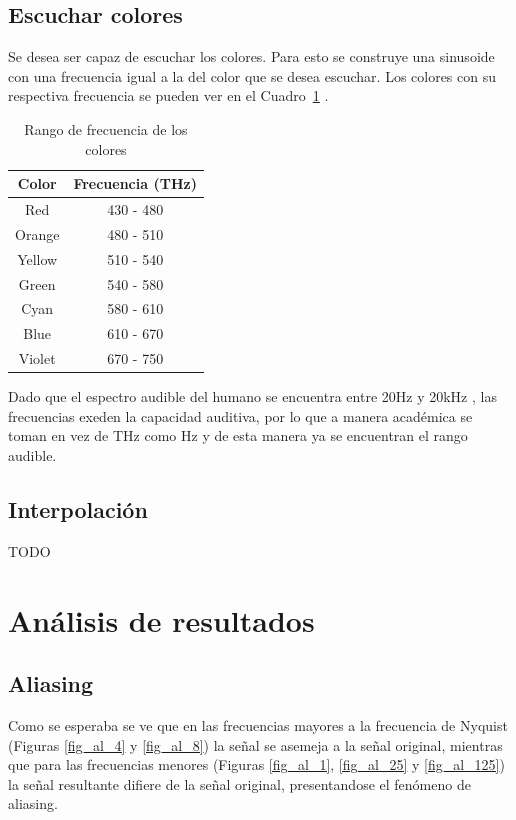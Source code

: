 \documentclass[comsoc, journal]{IEEEtran}
\begin{document}
\subsection{Escuchar colores}
Se desea ser capaz de escuchar los colores. Para esto se construye una sinusoide con una frecuencia igual a la del color que se desea escuchar. Los colores con su respectiva frecuencia se pueden ver en el Cuadro~\ref{table_color} \cite{bohren}.

\begin{table}[!t]
    \renewcommand{\arraystretch}{1.3}
    \caption{Rango de frecuencia de los colores}
    \label{table_color}
    \centering
    \begin{tabular}{|c|c|}
        \hline
        Color & Frecuencia (THz)\\
        \hline
        Red	    & 430 - 480\\
        \hline
        Orange	& 480 - 510\\
        \hline
        Yellow	& 510 - 540\\
        \hline
        Green	& 540 - 580\\
        \hline
        Cyan	& 580 - 610\\
        \hline
        Blue	& 610 - 670\\
        \hline
        Violet	& 670 - 750\\
        \hline
    \end{tabular}
\end{table}

Dado que el espectro audible del humano se encuentra entre 20Hz y 20kHz \cite{rosen}, las frecuencias exeden la capacidad auditiva, por lo que a manera académica se toman en vez de THz como Hz y de esta manera ya se encuentran el rango audible.

\subsection{Interpolación}
TODO

\section{Análisis de resultados}
\subsection{Aliasing}
Como se esperaba se ve que en las frecuencias mayores a la frecuencia de Nyquist (Figuras \ref{fig_al_4} y \ref{fig_al_8}) la señal se asemeja a la señal original, mientras que para las frecuencias menores (Figuras \ref{fig_al_1}, \ref{fig_al_25} y \ref{fig_al_125}) la señal resultante difiere de la señal original, presentandose el fenómeno de aliasing.
\end{document}
